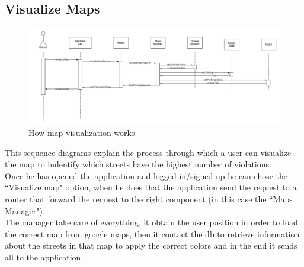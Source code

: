 \documentclass[12pt,a4paper]{report}
\begin{document}
			\subsection{Visualize Maps}
				\begin{figure}[H]
						\includegraphics[width = \textwidth, center]{Maps}
						\caption{How map visualization works}
						\label{fig: diagrams}
				\end{figure}

				This sequence diagrams explain the process through which a user can visualize the map to indentify which
				streets have the highest number of violations.\\
				Once he has opened the application and logged in/signed up he can chose the ``Visualize map" option,
				when he does that the application send the request to a router that forward the request to the right
				component (in this case the ``Maps Manager").\\
				The manager take care of everything, it obtain the user position in order to load the correct map from google
				maps, then it contact the db to retrieve information about the streets in that map to apply the correct colors
				and in the end it sends all to the application.
\end{document}
